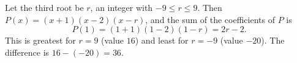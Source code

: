 Let the third root be $r$, an integer with $-9\le r\le9$. Then $P(x)=(x+1)(x-2)(x-r)$, and the sum of the coefficients of $P$ is
\[P(1)=(1+1)(1-2)(1-r)=2r-2.\]
This is greatest for $r=9$ (value $16$) and least for $r=-9$ (value $-20$). The difference is $16-(-20)=\boxed{36}$.
